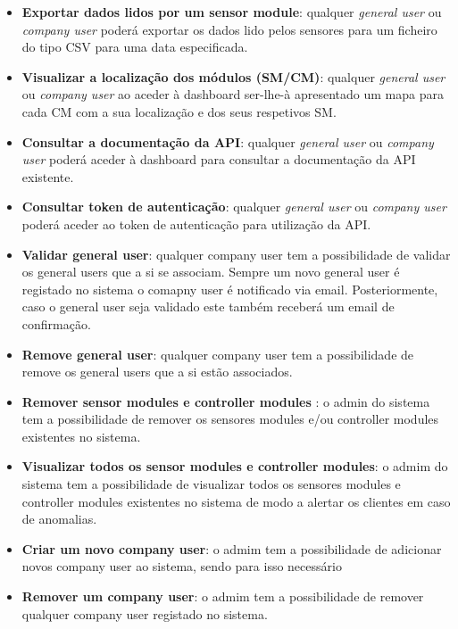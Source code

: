 \begin{itemize}
	\item \textbf{Exportar dados lidos por um sensor module}: qualquer \textit{general user} ou \textit{company user} poderá exportar os dados lido pelos sensores para um ficheiro do tipo \ac{CSV} para uma data especificada.
	
	\item \textbf{Visualizar a localização dos módulos (SM/CM)}: qualquer \textit{general user} ou \textit{company user} ao aceder à dashboard ser-lhe-à apresentado um mapa para cada \ac{CM} com a sua localização e dos seus respetivos \ac{SM}. 
	
	
	\item \textbf{Consultar a documentação da API}: qualquer \textit{general user} ou \textit{company user} poderá aceder à dashboard para consultar a documentação da API existente. 
		
	\item \textbf{Consultar token de autenticação}: qualquer \textit{general user} ou \textit{company user} poderá aceder ao token de autenticação para utilização da API. 
	

	
	\item \textbf{Validar general user}: qualquer company user tem a possibilidade de validar os general users que a si se associam. Sempre um novo general user é registado no sistema o comapny user é notificado via email. Posteriormente, caso o general user seja validado este também receberá um email de confirmação.  
	
	\item \textbf{Remove general user}: qualquer company user tem a possibilidade de remove os general users que a si estão associados. 
	
	
	\item \textbf{Remover sensor modules e controller modules }: o admin do sistema tem a possibilidade de remover os sensores modules e/ou controller modules existentes no sistema. 
	
	
	\item \textbf{Visualizar todos os sensor modules e controller modules}: o admim do sistema tem a possibilidade de visualizar todos os sensores modules e controller modules existentes no sistema de modo a alertar os clientes em caso de anomalias. 
	
	
	\item \textbf{Criar um novo company user}: o admim tem a possibilidade de adicionar novos company user ao sistema, sendo para isso necessário 
	
	\item \textbf{Remover um company user}: o admim tem a possibilidade de remover qualquer company user registado no sistema.
	
	
\end{itemize}









